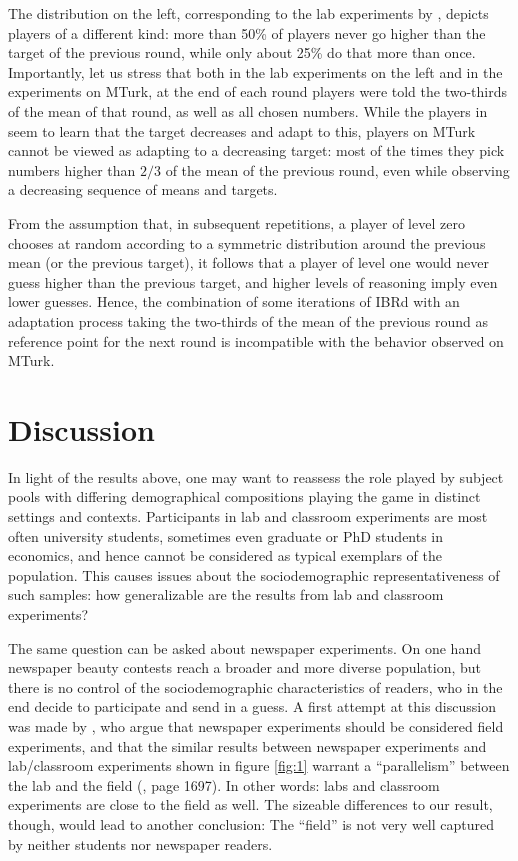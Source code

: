 \documentclass[12pt,review]{elsarticle}
\begin{document}
The distribution on the left, corresponding to the lab experiments by \citet{Nagel95}, depicts players of a different kind: more than 50\% of players never go higher than the target of the previous round, while only about 25\% do that more than once. Importantly, let us stress that both in the lab experiments on the left and in the experiments on MTurk, at the end of each round players were told the two-thirds of the mean of that round, as well as all chosen numbers. While the players in \citet{Nagel95} seem to learn that the target decreases and adapt to this, players on MTurk cannot be viewed as adapting to a decreasing target: most of the times they pick numbers higher than $2/3$ of the mean of the previous round, even while observing a decreasing sequence of means and targets.

From the assumption that, in subsequent repetitions, a player of level zero chooses at random according to a symmetric distribution around the previous mean (or the previous target), it follows that a player of level one would never guess higher than the previous target, and higher levels of reasoning imply even lower guesses. Hence, the combination of some iterations of IBRd with an adaptation process taking the two-thirds of the mean of the previous round as reference point for the next round is incompatible with the behavior observed on MTurk. 

\section{Discussion\label{sec:Discussion}}
\noindent
In light of the results above, one may want to reassess the role played by subject pools with differing demographical compositions playing the game in distinct settings and contexts. Participants in lab and classroom experiments are most often university students, sometimes even graduate or PhD students in economics, and hence cannot be considered as typical exemplars of the population. This causes issues about the sociodemographic representativeness of such samples: how generalizable are the results from lab and classroom experiments? 

The same question can be asked about newspaper experiments. On one hand newspaper beauty contests reach a broader and more diverse population, but there is no control of the sociodemographic characteristics of readers, who in the end decide to participate and send in a guess. A first attempt at this discussion was made by \citet{NagelEtAl02}, who argue that newspaper experiments should be considered field experiments, and that the similar results between newspaper experiments and lab/classroom experiments shown in figure \ref{fig:1} warrant a \textquotedblleft parallelism\textquotedblright {} between the lab and the field (\cite{NagelEtAl02}, page 1697). In other words: labs and classroom experiments are close to the field as well. The sizeable differences to our result, though, would lead to another conclusion: The ``field'' is not very well captured by neither students nor newspaper readers. 
\end{document}
